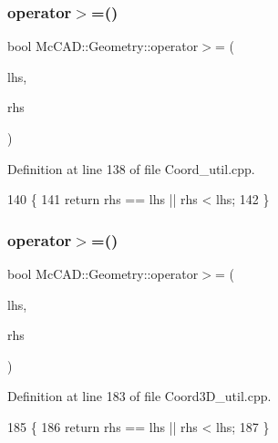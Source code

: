 \subsubsection{\texorpdfstring{operator$>$=()}{operator>=()}\hspace{0.1cm}{\footnotesize\ttfamily [2/3]}}
{\footnotesize\ttfamily bool Mc\+C\+A\+D\+::\+Geometry\+::operator$>$= (\begin{DoxyParamCaption}\item[{const \hyperlink{classMcCAD_1_1Geometry_1_1Coord}{Coord} \&}]{lhs,  }\item[{const \hyperlink{classMcCAD_1_1Geometry_1_1Coord}{Coord} \&}]{rhs }\end{DoxyParamCaption})}



Definition at line 138 of file Coord\+\_\+util.\+cpp.


\begin{DoxyCode}
140                          \{
141     \textcolor{keywordflow}{return} rhs == lhs || rhs < lhs;
142 \}
\end{DoxyCode}
\mbox{\label{namespaceMcCAD_1_1Geometry_a21f2ecd5844f82afa22167ef4b497c7e}} 
\subsubsection{\texorpdfstring{operator$>$=()}{operator>=()}\hspace{0.1cm}{\footnotesize\ttfamily [3/3]}}
{\footnotesize\ttfamily bool Mc\+C\+A\+D\+::\+Geometry\+::operator$>$= (\begin{DoxyParamCaption}\item[{const \hyperlink{classMcCAD_1_1Geometry_1_1Coord3D}{Coord3D} \&}]{lhs,  }\item[{const \hyperlink{classMcCAD_1_1Geometry_1_1Coord3D}{Coord3D} \&}]{rhs }\end{DoxyParamCaption})}



Definition at line 183 of file Coord3\+D\+\_\+util.\+cpp.


\begin{DoxyCode}
185                            \{
186     \textcolor{keywordflow}{return} rhs == lhs || rhs < lhs;
187 \}
\end{DoxyCode}
\mbox{\label{namespaceMcCAD_1_1Geometry_a36c23062f69cd17452c4f278569ea5ee}} 
